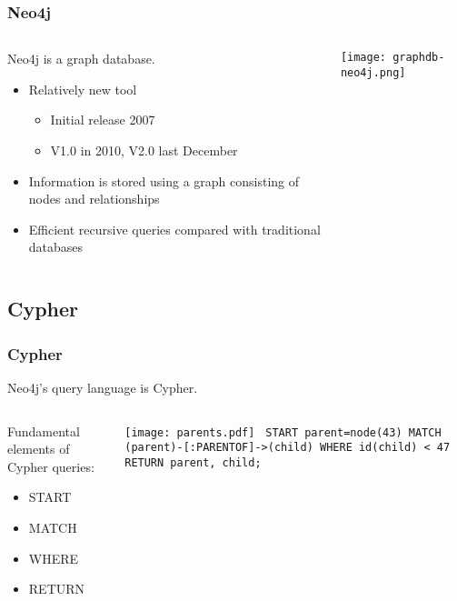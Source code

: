 \documentclass{beamer}
\begin{document}
\begin{frame}
	\frametitle{Neo4j}
	
	
	
\begin{columns} 
\begin{column}{0.60 \textwidth}
Neo4j is a graph database.
		\begin{itemize}
		\item Relatively new tool
			\begin{itemize}
			\item Initial release 2007
			\item V1.0 in 2010, V2.0 last December
			\end{itemize}
		\item Information is stored using a graph consisting of nodes and relationships
		\item Efficient recursive queries compared with traditional databases
		\end{itemize}
		\end{column}
		\begin{column}{0.40\textwidth}
   \texttt{[image: graphdb-neo4j.png]}
       \\
  \end{column}
  \end{columns}

\end{frame}

\subsection{Cypher}

\begin{frame}
	\frametitle{Cypher}
	Neo4j's query language is Cypher.
	\begin{columns}
	\begin{column}{0.325\textwidth}

	Fundamental elements of Cypher queries:
		\begin{itemize}
		\item START
		\item MATCH
		\item WHERE
		\item RETURN
		\end{itemize}
	\end{column}
	\begin{column}{0.675\textwidth}

	\texttt{[image: parents.pdf]}
	\linebreak
	\texttt{
START parent=node(43)
\linebreak
MATCH (parent)-[:PARENTOF]->(child)
\linebreak
WHERE id(child) < 47
\linebreak
RETURN parent, child;
}

	\end{column}	
	\end{columns}
\end{frame}
\end{document}

